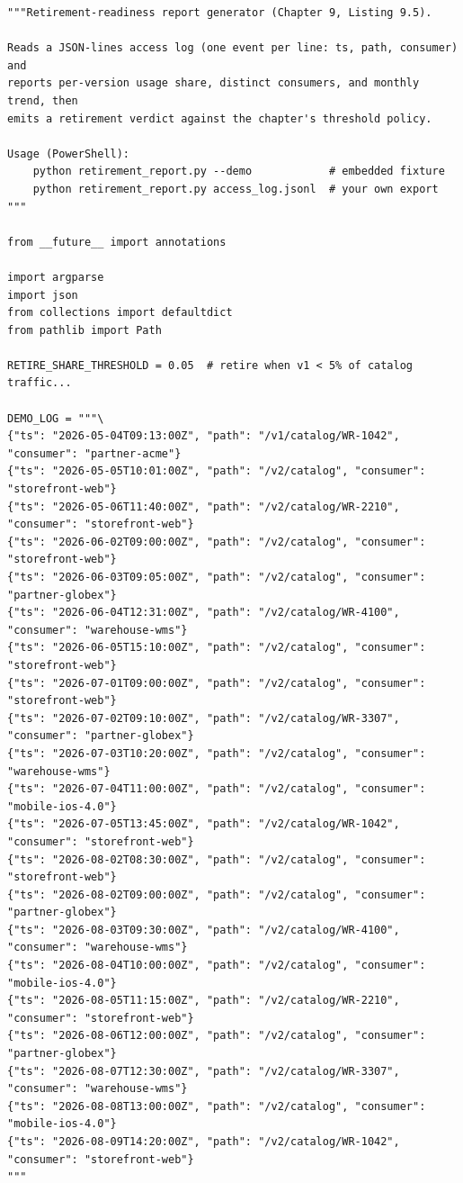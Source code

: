 \begin{verbatim}
"""Retirement-readiness report generator (Chapter 9, Listing 9.5).

Reads a JSON-lines access log (one event per line: ts, path, consumer) and
reports per-version usage share, distinct consumers, and monthly trend, then
emits a retirement verdict against the chapter's threshold policy.

Usage (PowerShell):
    python retirement_report.py --demo            # embedded fixture
    python retirement_report.py access_log.jsonl  # your own export
"""

from __future__ import annotations

import argparse
import json
from collections import defaultdict
from pathlib import Path

RETIRE_SHARE_THRESHOLD = 0.05  # retire when v1 < 5% of catalog traffic...

DEMO_LOG = """\
{"ts": "2026-05-04T09:13:00Z", "path": "/v1/catalog/WR-1042", "consumer": "partner-acme"}
{"ts": "2026-05-05T10:01:00Z", "path": "/v2/catalog", "consumer": "storefront-web"}
{"ts": "2026-05-06T11:40:00Z", "path": "/v2/catalog/WR-2210", "consumer": "storefront-web"}
{"ts": "2026-06-02T09:00:00Z", "path": "/v2/catalog", "consumer": "storefront-web"}
{"ts": "2026-06-03T09:05:00Z", "path": "/v2/catalog", "consumer": "partner-globex"}
{"ts": "2026-06-04T12:31:00Z", "path": "/v2/catalog/WR-4100", "consumer": "warehouse-wms"}
{"ts": "2026-06-05T15:10:00Z", "path": "/v2/catalog", "consumer": "storefront-web"}
{"ts": "2026-07-01T09:00:00Z", "path": "/v2/catalog", "consumer": "storefront-web"}
{"ts": "2026-07-02T09:10:00Z", "path": "/v2/catalog/WR-3307", "consumer": "partner-globex"}
{"ts": "2026-07-03T10:20:00Z", "path": "/v2/catalog", "consumer": "warehouse-wms"}
{"ts": "2026-07-04T11:00:00Z", "path": "/v2/catalog", "consumer": "mobile-ios-4.0"}
{"ts": "2026-07-05T13:45:00Z", "path": "/v2/catalog/WR-1042", "consumer": "storefront-web"}
{"ts": "2026-08-02T08:30:00Z", "path": "/v2/catalog", "consumer": "storefront-web"}
{"ts": "2026-08-02T09:00:00Z", "path": "/v2/catalog", "consumer": "partner-globex"}
{"ts": "2026-08-03T09:30:00Z", "path": "/v2/catalog/WR-4100", "consumer": "warehouse-wms"}
{"ts": "2026-08-04T10:00:00Z", "path": "/v2/catalog", "consumer": "mobile-ios-4.0"}
{"ts": "2026-08-05T11:15:00Z", "path": "/v2/catalog/WR-2210", "consumer": "storefront-web"}
{"ts": "2026-08-06T12:00:00Z", "path": "/v2/catalog", "consumer": "partner-globex"}
{"ts": "2026-08-07T12:30:00Z", "path": "/v2/catalog/WR-3307", "consumer": "warehouse-wms"}
{"ts": "2026-08-08T13:00:00Z", "path": "/v2/catalog", "consumer": "mobile-ios-4.0"}
{"ts": "2026-08-09T14:20:00Z", "path": "/v2/catalog/WR-1042", "consumer": "storefront-web"}
"""



\end{verbatim}
